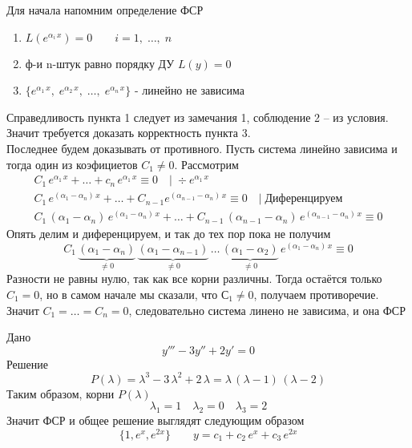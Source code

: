 \begin{Proof}
    Для начала напомним определение ФСР
    \begin{enumerate}
        \item $L(e^{\alpha_i\,x})=0 \qquad i=1,\; \dots,\; n$
        
        \item ф-и n-штук равно порядку ДУ $L(y)=0$
        
        \item $\{e^{\alpha_1\,x},\; e^{\alpha_2\,x},\; \dots,\; e^{\alpha_n\,x}\}$ - линейно не зависима
    \end{enumerate}
    Справедливость пункта 1 следует из замечания 1, соблюдение 2 -- из условия. Значит требуется доказать корректность пункта 3. \\
    Последнее будем доказывать от противного. Пусть система линейно зависима и тогда один из коэфициетов $C_1 \neq 0$. Рассмотрим
    \begin{gather*}
        C_1\,e^{\alpha_1\,x} + \dots +c_n\,e^{\alpha_1\,x} \equiv 0 \quad | \; \div e^{\alpha_1\,x}\\
        C_1\,e^{(\alpha_1-\alpha_n)\,x} + \dots + C_{n-1} e^{(\alpha_{n-1}-\alpha_n)\,x} \equiv 0 \quad |\; \text{Диференцируем}\\
        C_1\,(\alpha_1-\alpha_n)\,e^{(\alpha_1-\alpha_n)\,x} + \dots + C_{n-1}\,(\alpha_{n-1}-\alpha_n)\,e^{(\alpha_{n-1}-\alpha_n)\,x} \equiv 0
    \end{gather*}
    Опять делим и диференцируем, и так до тех пор пока не получим
    \[
        C_1\,\underbrace{(\alpha_1-\alpha_n)}_{\neq 0}\,\underbrace{(\alpha_1-\alpha_{n-1})}_{\neq 0}\,\dots\,\underbrace{(\alpha_1-\alpha_2)}_{\neq 0}\,e^{(\alpha_1-\alpha_n)\,x}\equiv 0
    \]
    Разности не равны нулю, так как все корни различны. Тогда остаётся только $C_1 = 0$, но в самом начале мы сказали, что $С_1 \neq 0$, получаем противоречие.\\
    Значит $C_1=\dots=C_n=0$, следовательно система линено не зависима, и она ФСР
\end{Proof}

\begin{Example}
    Дано
    \[
        y'''-3y''+2y'=0
    \]
    Решение
    \[
        P(\lambda)=\lambda^3-3\,\lambda^2+2\,\lambda=\lambda\,(\lambda-1)\,(\lambda-2)
    \]
    Таким образом, корни $P(\lambda)$
    \[
        \lambda_1=1 \quad \lambda_2=0 \quad \lambda_3=2  
    \]
    Значит ФСР и общее решение выглядят следующим образом
    \[
        \{1, e^x, e^{2x}\} \qquad y=c_1+c_2\,e^x+ c_3\,e^{2x}
    \]
\end{Example}

